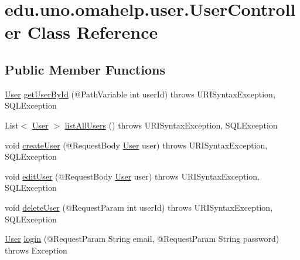 \hypertarget{classedu_1_1uno_1_1omahelp_1_1user_1_1_user_controller}{}\section{edu.\+uno.\+omahelp.\+user.\+User\+Controller Class Reference}
\label{classedu_1_1uno_1_1omahelp_1_1user_1_1_user_controller}
\subsection*{Public Member Functions}
\begin{DoxyCompactItemize}
\item 
\mbox{\hyperlink{classedu_1_1uno_1_1omahelp_1_1user_1_1_user}{User}} \mbox{\hyperlink{classedu_1_1uno_1_1omahelp_1_1user_1_1_user_controller_a5a90651af7dcd51135e810f0e7cce451}{get\+User\+By\+Id}} (@Path\+Variable int user\+Id)  throws U\+R\+I\+Syntax\+Exception, S\+Q\+L\+Exception 
\item 
List$<$ \mbox{\hyperlink{classedu_1_1uno_1_1omahelp_1_1user_1_1_user}{User}} $>$ \mbox{\hyperlink{classedu_1_1uno_1_1omahelp_1_1user_1_1_user_controller_acc5f63f341ece707127e3915db5a85df}{list\+All\+Users}} ()  throws U\+R\+I\+Syntax\+Exception, S\+Q\+L\+Exception 
\item 
void \mbox{\hyperlink{classedu_1_1uno_1_1omahelp_1_1user_1_1_user_controller_a7167a8f081b5f02f891ec356779c01ae}{create\+User}} (@Request\+Body \mbox{\hyperlink{classedu_1_1uno_1_1omahelp_1_1user_1_1_user}{User}} user)  throws U\+R\+I\+Syntax\+Exception, S\+Q\+L\+Exception 
\item 
void \mbox{\hyperlink{classedu_1_1uno_1_1omahelp_1_1user_1_1_user_controller_a927db3a77547e5c129a02bcfc1bacddb}{edit\+User}} (@Request\+Body \mbox{\hyperlink{classedu_1_1uno_1_1omahelp_1_1user_1_1_user}{User}} user)  throws U\+R\+I\+Syntax\+Exception, S\+Q\+L\+Exception 
\item 
void \mbox{\hyperlink{classedu_1_1uno_1_1omahelp_1_1user_1_1_user_controller_a5ca080d27acf3359a338994e3bdaf5b6}{delete\+User}} (@Request\+Param int user\+Id)  throws U\+R\+I\+Syntax\+Exception, S\+Q\+L\+Exception 
\item 
\mbox{\hyperlink{classedu_1_1uno_1_1omahelp_1_1user_1_1_user}{User}} \mbox{\hyperlink{classedu_1_1uno_1_1omahelp_1_1user_1_1_user_controller_ac9c9bf78bbd14781ac3493e6d1cfcffc}{login}} (@Request\+Param String email, @Request\+Param String password)  throws Exception 
\end{DoxyCompactItemize}



